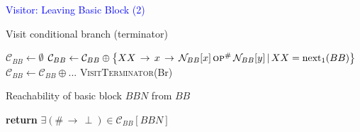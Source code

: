\documentclass[10pt,handout]{beamer}
\begin{document}
\begin{frame}[fragile]{\textcolor{blue}{Visitor: Leaving Basic Block (2)}}


\begin{algorithm}[H]
\caption{Visit conditional branch (terminator)}
\begin{algorithmic}[1]
\State $\mathcal{C}_{BB} \gets \emptyset$
\State $\mathcal{C}_{BB} \gets  \mathcal{C}_{BB} \oplus \left\lbrace XX \,\rightarrow\, x\,\rightarrow\, \mathcal{N}_{BB}[x]\,\textsc{op}^\#\,\mathcal{N}_{BB}[y]
\,|\,
XX = \text{next}_1(BB)
\right\rbrace$
\State $\mathcal{C}_{BB}\gets \mathcal{C}_{BB} \oplus ...$
\State \textsc{VisitTerminator}(Br)
\EndProcedure
\end{algorithmic}
\end{algorithm}


\begin{algorithm}[H]
\caption{Reachability of basic block $BBN$ from $BB$}
\begin{algorithmic}[1]
\State \textbf{return} $\exists (\#\,\rightarrow\,\perp)\in \mathcal{C}_{BB}[BBN]$
\EndProcedure
\end{algorithmic}
\end{algorithm}
\end{frame}


%
%
%
\end{document}
